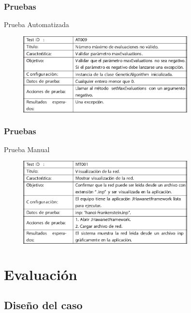 \documentclass[9pt]{beamer}
\begin{document}
    \begin{frame}
        \frametitle{Pruebas}     
        Prueba Automatizada
        \begin{figure}
            \includegraphics[width=0.8\textwidth]{assets/PruebaAutomatizada.eps}
        \end{figure}
        
    \end{frame}

    \begin{frame}
        \frametitle{Pruebas}     
        Prueba Manual
        \begin{figure}
            \includegraphics[width=0.8\textwidth]{assets/PruebaManual.eps}
        \end{figure}
        
    \end{frame}

    \section{Evaluación}
    \subsection{Diseño del caso}
\end{document}

